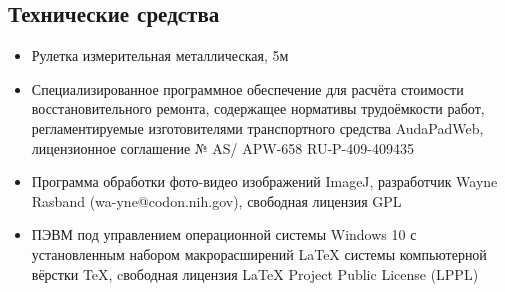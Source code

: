 \subsection{Технические средства}  %
%
\begin{itemize}
%
\item  Рулетка измерительная металлическая, 5м
%
\item Специализированное программное обеспечение для расчёта стоимости  восстановительного ремонта, содержащее нормативы трудоёмкости работ, регламентируемые изготовителями транспортного средства     AudaPadWeb, лицензионное соглашение № AS/\- APW-658  RU-P-409-409435
%
\item  Программа обработки фото-видео изображений ImageJ, разработчик  Wayne Rasband (wa-yne@codon.nih.gov),
свободная лицензия GPL
%
\item  ПЭВМ под управлением операционной системы Windows 10 с установленным набором макрорасширений LaTeX системы компьютерной вёрстки TeX, cвободная лицензия LaTeX Project Public License (LPPL)
%	
	\end{itemize}
